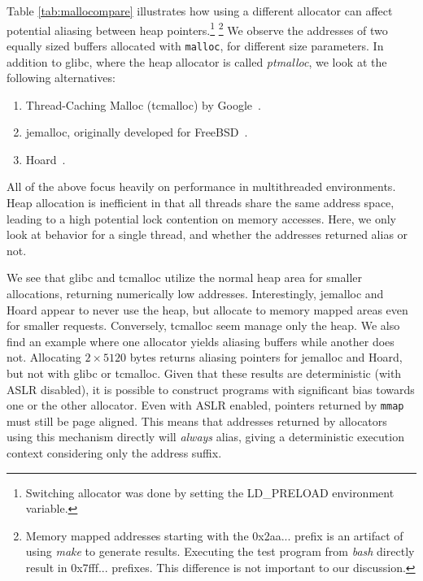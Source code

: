 \documentclass[10pt, conference, compsocconf]{IEEEtran}
\begin{document}
Table \ref{tab:mallocompare} illustrates how using a different allocator can affect potential aliasing between heap pointers.\footnote{Switching allocator was done by setting the LD\_PRELOAD environment variable.} \footnote{Memory mapped addresses starting with the 0x2aa... prefix is an artifact of using \emph{make} to generate results. Executing the test program from \emph{bash} directly result in 0x7fff... prefixes. This difference is not important to our discussion.}
We observe the addresses of two equally sized buffers allocated with \texttt{malloc}, for different size parameters.
In addition to glibc, where the heap allocator is called \emph{ptmalloc}, we look at the following alternatives:
\begin{enumerate}
  \item Thread-Caching Malloc (tcmalloc) by Google~\cite{TCMalloc}.
  \item jemalloc, originally developed for FreeBSD~\cite{JEMalloc}.
  \item Hoard~\cite{Berger:2000:Hoard}.
\end{enumerate}
All of the above focus heavily on performance in multithreaded environments.
Heap allocation is inefficient in that all threads share the same address space, leading to a high potential lock contention on memory accesses.
Here, we only look at behavior for a single thread, and whether the addresses returned alias or not.

We see that glibc and tcmalloc utilize the normal heap area for smaller allocations, returning numerically low addresses. %
Interestingly, jemalloc and Hoard appear to never use the heap, but allocate to memory mapped areas even for smaller requests.
Conversely, tcmalloc seem manage only the heap.
We also find an example where one allocator yields aliasing buffers while another does not.
Allocating $2 \times 5120$ bytes returns aliasing pointers for jemalloc and Hoard, but not with glibc or tcmalloc.
Given that these results are deterministic (with ASLR disabled), it is possible to construct programs with significant bias towards one or the other allocator.
Even with ASLR enabled, pointers returned by \texttt{mmap} must still be page aligned.
This means that addresses returned by allocators using this mechanism directly will \emph{always} alias, giving a deterministic execution context considering only the address suffix.
\end{document}
